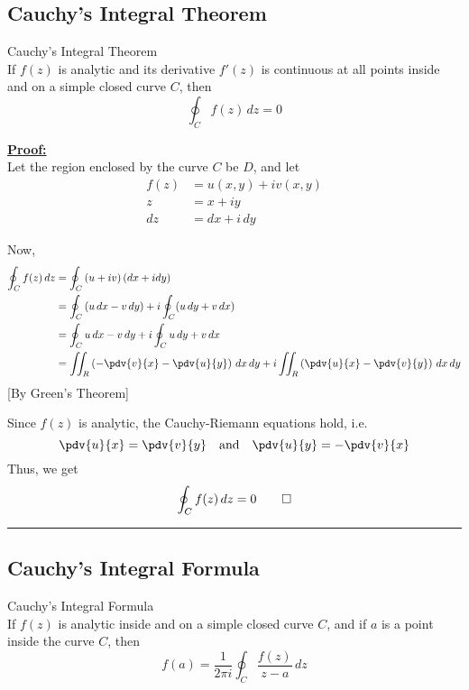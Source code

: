 \subsection{Cauchy's Integral Theorem}
\begin{theorem}{Cauchy's Integral Theorem}{}
    \\If $f(z)$ is analytic and its derivative $f'(z)$ is continuous at all points inside and on a simple closed curve $C$, then
    \begin{equation}
        \oint_C f(z) \, dz = 0
    \end{equation}
\end{theorem}

\underline{\textbf{Proof:}} \\
Let the region enclosed by the curve $C$ be $D$, and let
\begin{align*}
    f(z) &= u(x,y) + iv(x,y) \\
    z &= x + iy \\
    dz &= dx + i \, dy
\end{align*}

Now,
\begin{align*}
    \oint_C {f(z) \, dz} &= \oint_C {\left( u+iv \right)\left( dx + idy \right)}  \\
    &= \oint_C {(u \, dx - v \, dy) + i \oint_C (u \, dy + v \, dx)} \\
    &= \oint_C {u \, dx - v \, dy} + i \oint_C {u \, dy + v \, dx} \\
    &= \iint_R \left( -\pdv{v}{x} - \pdv{u}{y} \right) \, dx \, dy + i \iint_R \left( \pdv{u}{x} - \pdv{v}{y} \right) \, dx \, dy
\end{align*}
\hfill[By Green's Theorem]

Since $f(z)$ is analytic, the Cauchy-Riemann equations hold, i.e.
\begin{equation*}
    \pdv{u}{x} = \pdv{v}{y} 
    \quad \text{and} \quad
    \pdv{u}{y} = -\pdv{v}{x}
\end{equation*}
Thus, we get \[
    \oint_C f(z) \, dz = 0 \qed
\] 

\vspace{20pt}\rule{3in}{1pt}


\subsection{Cauchy's Integral Formula}
\begin{theorem}{Cauchy's Integral Formula}{}
    \\If $f(z)$ is analytic inside and on a simple closed curve $C$, and if $a$ is a point inside the curve $C$, then
    \begin{equation}
        f(a) = \frac{1}{2\pi i} \oint_C \frac{f(z)}{z-a} \, dz
    \end{equation}
\end{theorem}

